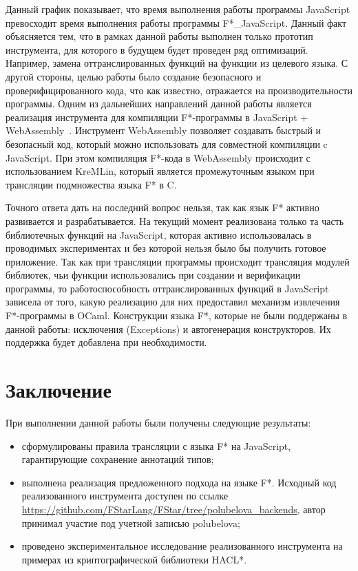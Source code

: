 Данный график показывает, что время выполнения работы программы JavaScript превосходит время выполнения работы программы F*\_JavaScript. Данный факт объясняется тем, что в рамках данной работы выполнен только прототип инструмента, для которого в будущем будет проведен ряд оптимизаций. Например, замена оттранслированных функций на функции из целевого языка. С другой стороны, целью работы было создание безопасного и проверифицированного кода, что как известно, отражается на производительности программы. Одним из дальнейших направлений данной работы является реализация инструмента для компиляции F*-программы в JavaScript + WebAssembly~\cite{wasm}. Инструмент WebAssembly позволяет создавать быстрый и безопасный код, который можно использовать для совместной компиляции c JavaScript. При этом компиляция F*-кода в WebAssembly происходит с использованием KreMLin, который является промежуточным языком при трансляции подмножества языка F* в C. 

Точного ответа дать на последний вопрос нельзя, так как язык F* активно развивается и разрабатывается. На текущий момент реализована только та часть библиотечных функций на JavaScript, которая активно использовалась в проводимых экспериментах и без которой нельзя было бы получить готовое приложение. Так как при трансляции программы происходит трансляция модулей библиотек, чьи функции использовались при создании и верификации программы, то работоспособность оттранслированных функций в JavaScript зависела от того, какую реализацию для них предоставил механизм извлечения F*-программы в OCaml. Конструкции языка F*, которые не были поддержаны в данной работы: исключения (Exceptions) и автогенерация конструкторов. Их поддержка будет добавлена при необходимости. 


\section*{Заключение}
При выполнении данной работы были получены следующие результаты:
\begin{itemize}
\item сформулированы правила трансляции с языка F* на JavaScript, гарантирующие сохранение аннотаций типов;
\item выполнена реализация предложенного подхода на языке F*. Исходный код реализованного инструмента доступен по ссылке {\small \url{https://github.com/FStarLang/FStar/tree/polubelova\_backends}}, автор принимал участие под учетной записью polubelova;
\item проведено экспериментальное исследование реализованного инструмента на примерах из криптографической библиотеки HACL*.
\end{itemize}

